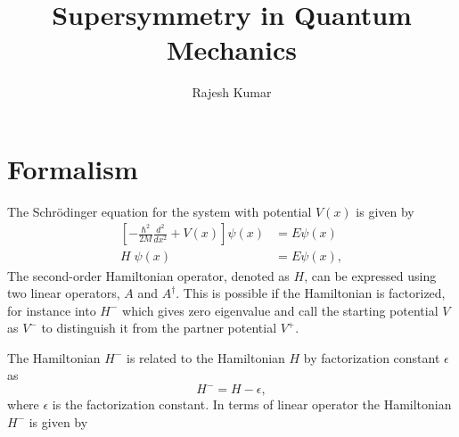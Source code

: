 \documentclass[a4paper, 12pt]{article}
\title{Supersymmetry in Quantum Mechanics}
\author{Rajesh Kumar}
\begin{document}
\maketitle

\section{Formalism}
The Schr\"{o}dinger equation for the system with potential $V(x)$ is given by
\begin{align}
\left[-\frac{\hbar^2}{2M}\frac{d^2}{dx^2} + V(x)\right]\psi(x) &= E\psi(x)\nonumber\\
H\;\psi(x) &= E\psi(x),
\end{align}
The second-order Hamiltonian operator, denoted as \( H \), can be expressed using two linear operators, \( A \) and \( A^\dagger \). This is possible if the Hamiltonian is factorized, for instance into \( H^- \) which gives zero eigenvalue and call the starting potential \( V \) as \( V^- \) to distinguish it from the partner potential \( V^+ \). 

The Hamiltonian \( H^- \) is related to the Hamiltonian \( H \) by factorization constant \( \epsilon \) as
\begin{equation}
    H^- = H - \epsilon,
\end{equation}
where \( \epsilon \) is the factorization constant. In terms of linear operator the Hamiltonian \( H^- \) is given by
\end{document}
